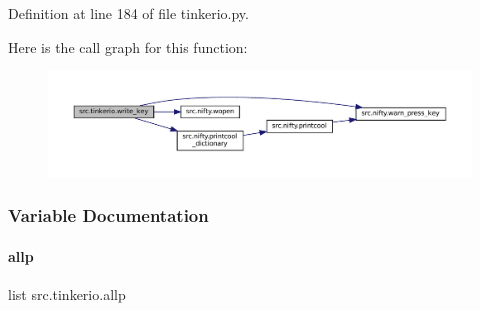 Definition at line 184 of file tinkerio.\+py.

Here is the call graph for this function\+:
\nopagebreak
\begin{figure}[H]
\begin{center}
\leavevmode
\includegraphics[width=350pt]{namespacesrc_1_1tinkerio_a31804fdc4114aacf17a92c48595cbab0_cgraph}
\end{center}
\end{figure}


\subsubsection{Variable Documentation}
\mbox{\label{namespacesrc_1_1tinkerio_a6ba025f75f7361d1ac7d242797561ff7}} 
\paragraph{\texorpdfstring{allp}{allp}}
{\footnotesize\ttfamily list src.\+tinkerio.\+allp}

